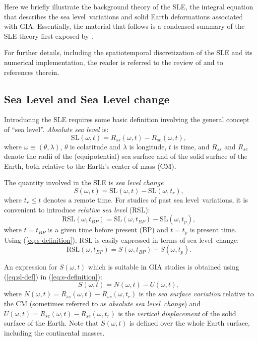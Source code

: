 \documentclass[11pt,fleqn,a4paper,titlepage]{article}
\newcommand\sealevel{sea level~}
\newcommand\sealevels{sea level}
\begin{document}
Here we briefly illustrate the background theory of the SLE, the integral equation that describes the \sealevel variations and solid Earth deformations associated with GIA. Essentially, the material that follows is a condensed summary of the SLE theory first exposed by \citet{Farrell_and_Clark_1976}. 

For further details, including the spatiotemporal discretization of the SLE and its  numerical implementation, the reader is referred to the review of \citet{Spada_and_Stocchi_2006} and to references therein. 

\subsection{Sea Level and Sea Level change}\label{sec:slc}

Introducing the SLE requires some basic definition involving the general concept of ``\sealevels''. 
\emph{Absolute \sealevels} is:
\begin{equation}\label{eq:sl-def}
\textrm{SL}(\omega,t) = R_{ss}(\omega,t) - R_{se}(\omega,t), 
\end{equation}
where $\omega\equiv (\theta,\lambda)$, $\theta$ is colatitude and $\lambda$ is longitude, $t$ is time, and
$R_{ss}$ and $R_{se}$ denote the radii of the (equipotential) sea surface and of the solid surface 
of the Earth, both relative to the Earth's center of mass (CM). 

The quantity involved in the SLE is \emph{sea level change}
\begin{equation}\label{eq:s-definition}
S(\omega, t) = \textrm{SL}(\omega,t) - \textrm{SL}(\omega,t_{r}), 
\end{equation}
where $t_{r} \le t$ denotes a remote time. For studies 
of past \sealevel variations, it is convenient to introduce 
\emph{relative sea level} (RSL):
\begin{equation}
\textrm{RSL}(\omega,t_{BP})=\textrm{SL}(\omega,t_{BP})- \textrm{SL}(\omega,t_{p}),
\end{equation}
where $t=t_{BP}$ is a given time before present (BP) and $t=t_p$ is present time. 
Using (\ref{eq:s-definition}), {RSL} is easily expressed in terms of \sealevel change: 
\begin{equation}\label{eq:rsl-vs-s}
\textrm{RSL}(\omega,t_{BP})= {S}(\omega,t_{BP})- {S}(\omega,t_{p}).
\end{equation}

An expression for $S(\omega, t)$ which is suitable in GIA studies is 
obtained using (\ref{eq:sl-def}) in
(\ref{eq:s-definition}): 
\begin{equation}\label{sle-original}
S(\omega, t) = N(\omega,t) - U(\omega,t), 
\end{equation}
where $N(\omega,t)= R_{ss}(\omega,t) - R_{ss}(\omega,t_r)$ is the \textit{sea surface variation} relative to the CM (sometimes referred to as \emph{absolute \sealevel change}) and $U(\omega,t)= R_{se}(\omega,t) - R_{se}(\omega,t_r)$ is the \emph{vertical displacement} of the solid surface of the Earth. Note that $S(\omega, t)$ is defined over the whole Earth surface, including the continental masses. 
\end{document}
